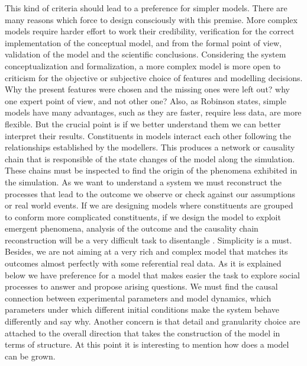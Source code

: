 \documentclass[11pt,oneside,a4paper,openright]{report}
\begin{document}
This kind of criteria should lead to a preference for simpler models. There are many reasons which force to design consciously with this premise. More complex models require harder effort to work their credibility, verification
for the correct implementation of the conceptual model, and from the formal point of view, validation of the model and the scientific conclusions. Considering the system conceptualization and formalization, a more complex model is more open to criticism for the objective or subjective choice of features and modelling decisions. Why the present features were chosen and the missing ones were left out? why one expert point of view, and not other one? Also, as Robinson \cite{Robinson2008} states, simple models have many advantages, such as they are faster, require less data, are more flexible. But the crucial point is if we better understand them we can better interpret their results. Constituents in models interact each other following the relationships established by the modellers. This produces a network or causality chain that is responsible of the state changes of the model along the simulation. These chains must be inspected to find the origin of the phenomena exhibited in the simulation. As we want to understand a system we must reconstruct the processes that lead to the outcome we observe or check against our assumptions or real world events. If we are designing models where constituents are grouped to conform more complicated constituents, if we design the model to exploit emergent phenomena, analysis of the outcome and the causality chain reconstruction will be a very difficult task to disentangle \cite[p.31]{Premo2010}\label{myPremo_simplicity}. Simplicity is a must. Besides, we are not aiming at a very rich and complex model that matches its outcomes almost perfectly with some referential real data. As it is explained below we have preference for a model that makes easier the task to explore social processes to answer and propose arising questions. We must find the causal connection between experimental parameters and model dynamics, which parameters under which different initial conditions make the system behave differently and say why.
Another concern is that detail and granularity choice are attached to the overall direction that takes the construction of the model in terms of structure. At this point it is interesting to mention how does a model can be grown.\\
\end{document}
